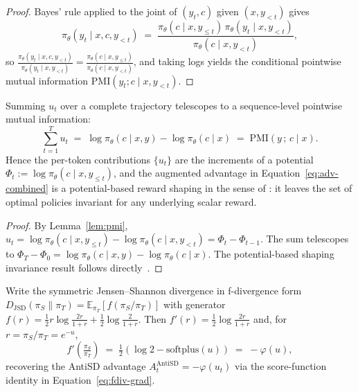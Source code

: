 \documentclass{llmxive}
\begin{document}
\begin{proof}
  Bayes' rule applied to the joint of $(y_t, c)$ given $(x, y_{<t})$ gives
  \begin{equation*}
    \pi_\theta(y_t \mid x, c, y_{<t}) \;=\; \frac{\pi_\theta(c \mid x, y_{\le t})\,\pi_\theta(y_t \mid x, y_{<t})}{\pi_\theta(c \mid x, y_{<t})},
  \end{equation*}
  so $\frac{\pi_\theta(y_t \mid x, c, y_{<t})}{\pi_\theta(y_t \mid x, y_{<t})} = \frac{\pi_\theta(c \mid x, y_{\le t})}{\pi_\theta(c \mid x, y_{<t})}$, and taking logs yields the conditional pointwise mutual information $\mathrm{PMI}(y_t; c \mid x, y_{<t})$.
\end{proof}

\begin{lemma}
  \label{lem:telescope}
  Summing $u_t$ over a complete trajectory telescopes to a sequence-level pointwise mutual information:
  \begin{equation*}
    \sum_{t=1}^{T} u_t \;=\; \log \pi_\theta(c \mid x, y) - \log \pi_\theta(c \mid x) \;=\; \mathrm{PMI}(y\,;\, c \mid x).
  \end{equation*}
  Hence the per-token contributions $\{u_t\}$ are the increments of a potential $\Phi_t := \log \pi_\theta(c \mid x, y_{\le t})$, and the augmented advantage in Equation~\eqref{eq:adv-combined} is a potential-based reward shaping in the sense of \citet{ng1999policy}: it leaves the set of optimal policies invariant for any underlying scalar reward.
\end{lemma}

\begin{proof}
  By Lemma~\ref{lem:pmi}, $u_t = \log \pi_\theta(c \mid x, y_{\le t}) - \log \pi_\theta(c \mid x, y_{<t}) = \Phi_t - \Phi_{t-1}$. The sum telescopes to $\Phi_T - \Phi_0 = \log \pi_\theta(c \mid x, y) - \log \pi_\theta(c \mid x)$. The potential-based shaping invariance result follows directly~\citep{ng1999policy}.
\end{proof}

\begin{lemma}
  \label{lem:jsd-shape}
  Write the symmetric Jensen--Shannon divergence in f-divergence form $D_{\mathrm{JSD}}(\pi_S \| \pi_T) = \mathbb{E}_{\pi_T}[f(\pi_S / \pi_T)]$ with generator $f(r) = \tfrac12 r \log \frac{2r}{1+r} + \tfrac12 \log \frac{2}{1+r}$. Then $f'(r) = \tfrac{1}{2} \log \frac{2r}{1+r}$ and, for $r = \pi_S/\pi_T = e^{-u}$,
  \begin{equation*}
    f'\!\left(\tfrac{\pi_S}{\pi_T}\right) \;=\; \tfrac{1}{2}\!\left(\log 2 - \mathrm{softplus}(u)\right) \;=\; -\varphi(u),
  \end{equation*}
  recovering the AntiSD advantage $A_t^{\mathrm{AntiSD}} = -\varphi(u_t)$ via the score-function identity in Equation~\eqref{eq:fdiv-grad}.
\end{lemma}
\end{document}
